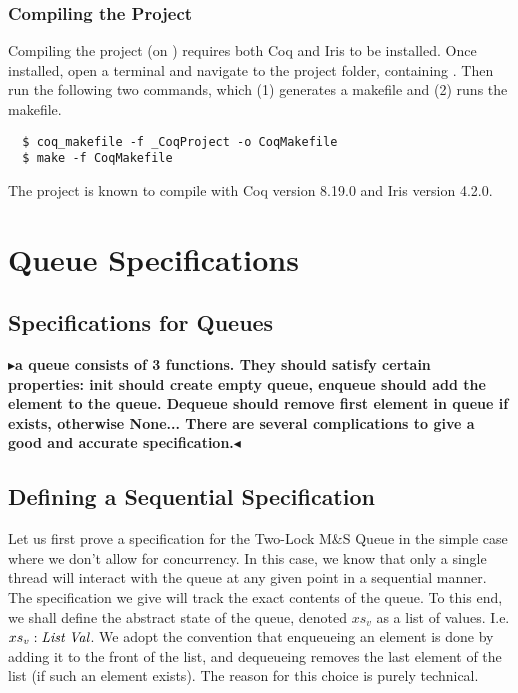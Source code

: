 \documentclass[a4paper, 10pt]{report}
\theoremstyle{definition}
\newcommand{\msq}{M\&S Queue}
\newcommand{\tlmsq}{Two-Lock \msq{}}
\newcommand{\absvalueList}{xs_v}
\newcommand{\todo}[1]{{\color[rgb]{.5,0,0}\textbf{$\blacktriangleright$#1$\blacktriangleleft$}}}
\begin{document}
\subsection{Compiling the Project}
Compiling the project (on \linuxname) requires both Coq and Iris to be installed. Once installed, open a terminal and navigate to the project folder, containing . Then run the following two commands, which (1) generates a makefile and (2) runs the makefile.
\begin{verbatim}
  $ coq_makefile -f _CoqProject -o CoqMakefile
  $ make -f CoqMakefile
\end{verbatim}
The project is known to compile with Coq version 8.19.0 and Iris version 4.2.0.


\chapter{Queue Specifications}
\label{ch:QueueSpecs}

\section{Specifications for Queues}
\label{QueueSpecs:section:specs}
\todo{a queue consists of 3 functions. They should satisfy certain properties: init should create empty queue, enqueue should add the element to the queue. Dequeue should remove first element in queue if exists, otherwise None... There are several complications to give a good and accurate specification.}

\section{Defining a Sequential Specification}
\label{QueueSpecs:section:seq}

Let us first prove a specification for the \tlmsq{} in the simple case where we don't allow for concurrency. In this case, we know that only a single thread will interact with the queue at any given point in a sequential manner. The specification we give will track the exact contents of the queue. To this end, we shall define the abstract state of the queue, denoted $\absvalueList$ as a list of \heaplang values. I.e. $\absvalueList : \List ~ \Val$. We adopt the convention that enqueueing an element is done by adding it to the front of the list, and dequeueing removes the last element of the list (if such an element exists). The reason for this choice is purely technical.
\end{document}
